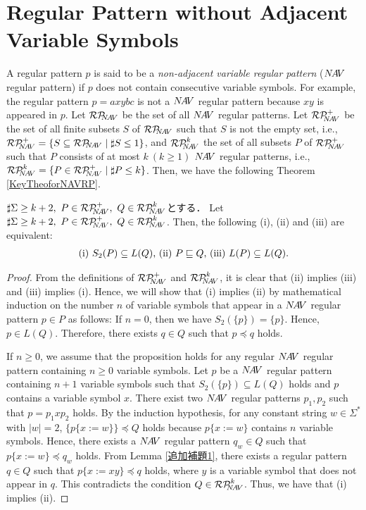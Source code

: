 \section{Regular Pattern without Adjacent Variable Symbols}

A regular pattern $p$ is said to be a {\it non-adjacent variable regular pattern} ($N\!A\!V$ regular pattern)  
if $p$ does not contain consecutive variable symbols.
For example, the regular pattern $p=axybc$ is not a $N\!A\!V$ regular pattern because $xy$ is appeared in $p$.
Let $\mathcal{RP}_{\!\!\!N\!A\!V}$ be the set of all $N\!A\!V$ regular patterns.
Let $\mathcal{RP}^{+}_{\!\!\!N\!A\!V}$ be the set of all finite subsets $S$ of $\mathcal{RP}_{\!\!\!N\!A\!V}$ such that $S$ is not the empty set, i.e., $\NAVRPplus=\{S \subseteq \NAVRP \mid \sharp S \leq 1\}$,
and $\mathcal{RP}^{k}_{\!\!\!N\!A\!V}$ the set of all subsets $P$ of $\mathcal{RP}^{+}_{\!\!\!N\!A\!V}$ such that $P$ consists of at most $k~(k\geq 1)$ $N\!A\!V$ regular patterns, i.e., $\NAVRPkei=\{P\in \NAVRPplus \mid \sharp P \leq k\}$.
Then, we have the following Theorem \ref{KeyTheoforNAVRP}.

\begin{thm}\label{KeyTheoforNAVRP}%
  $\sharp \Sigma \ge k+2,~P\in \NAVRPplus,~Q \in \NAVRPkei$とする．
Let $\sharp \Sigma \ge k+2,~P\in \NAVRPplus,~Q \in \NAVRPkei$.  
Then, the following (i), (ii) and (iii) are equivalent:
\[
\begin{tabular}{ll}
(i) $S_{2}(P) \subseteq L(Q)$,
(ii) $P \sqsubseteq Q$,
(iii) $L(P) \subseteq L(Q)$.
\end{tabular}
\]
\end{thm}

\begin{proof}
From the definitions of $\mathcal{RP}^{+}_{\!\!\!N\!A\!V}$ and $\mathcal{RP}^{k}_{\!\!\!N\!A\!V}$, it is clear that (ii) implies (iii)  and  (iii) implies (i).
Hence, we will show that (i) implies (ii) 
by mathematical induction on the number $n$ of variable symbols that appear in a $N\!A\!V$ regular pattern $p\in P$ as follows:
If $n=0$, then we have $S_{2}(\{p\})= \{ p \}$.
Hence, $p \in L(Q)$.
Therefore, there exists $q \in Q$ such that $p \preceq q$ holds.

If $n \ge 0$, we assume that the proposition holds for any regular $N\!A\!V$ regular pattern containing $n \ge 0$ variable symbols.
Let $p$ be a $N\!A\!V$ regular pattern containing $n+1$ variable symbols such that $S_{2}(\{p\}) \subseteq L(Q)$ holds and $p$ contains a variable symbol $x$.
There exist two $N\!A\!V$ regular patterns $p_{1},p_{2}$ such that $p=p_{1}xp_{2}$ holds.
By the induction hypothesis, for any constant string $w\in \Sigma^{\ast}$ with $|w|=2$, $\{p\{x:=w\}\}\preceq Q$ holds because $p\{x:=w\}$ contains $n$ variable symbols.
Hence, there exists a $N\!A\!V$ regular pattern $q_{w} \in Q$ such that $p \{ x:=w \} \preceq q_{w}$ holds.
From Lemma \ref{追加補題1}, there exists a regular pattern $q \in Q$ such that $p \{ x:=xy \} \preceq q$ holds, where $y$ is a variable symbol that does not appear in $q$.
This contradicts the condition $Q \in \mathcal{RP}^{k}_{\!\!\!N\!A\!V}$.
Thus, we have that (i) implies (ii).
\end{proof}


